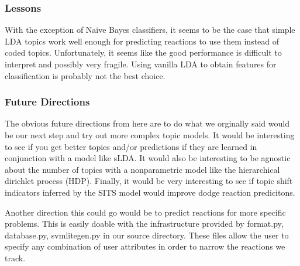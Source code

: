
\subsubsection{Lessons}

With the exception of Naive Bayes classifiers, it seems to be the case that simple LDA topics work well enough for predicting reactions to use them instead of coded topics. 
Unfortunately, it seems like the good performance is difficult to interpret and possibly very fragile.
Using vanilla LDA to obtain features for classification is probably not the best choice.

\subsubsection{Future Directions}

The obvious future directions from here are to do what we orginally said would be our next step and try out more complex topic models.
It would be interesting to see if you get better topics and/or predictions if they are learned in conjunction with a model like sLDA.
It would also be interesting to be agnostic about the number of topics with a nonparametric model like the hierarchical dirichlet process (HDP).
Finally, it would be very interesting to see if topic shift indicators inferred by the SITS model would improve dodge reaction predicitons.

Another direction this could go would be to predict reactions for more specific problems.
This is easily doable with the infrastructure provided by format.py, database.py, svmlitegen.py in our source directory.
These files allow the user to specify any combination of user attributes in order to narrow the reactions we track.

